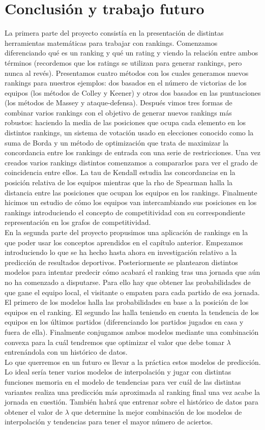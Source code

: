 \chapter{Conclusión y trabajo futuro}
La primera parte del proyecto consistía en la presentación de distintas herramientas matemáticas para trabajar con rankings. Comenzamos diferenciando qué es un ranking y qué un rating y viendo la relación entre ambos términos (recordemos que los ratings se utilizan para generar rankings, pero nunca al revés). Presentamos cuatro métodos con los cuales generamos nuevos rankings para nuestros ejemplos: dos basados en el número de victorias de los equipos (los métodos de Colley y Keener) y otros dos basados en las puntuaciones (los métodos de Massey y ataque-defensa).
Después vimos tres formas de combinar varios rankings con el objetivo de generar nuevos rankings más robustos: haciendo la media de las posiciones que ocupa cada elemento en los distintos rankings, un sistema de votación usado en elecciones conocido como la suma de Borda y un método de optimización que trata de maximizar la concordancia entre los rankings de entrada con una serie de restricciones. 
Una vez creados varios rankings distintos comenzamos a compararlos para ver el grado de coincidencia entre ellos. La tau de Kendall estudia las concordancias en la posición relativa de los equipos mientras que la rho de Spearman halla la distancia entre las posiciones que ocupan los equipos en los rankings. 
Finalmente hicimos un estudio de cómo los equipos van intercambiando sus posiciones en los rankings introduciendo el concepto de competitividad con su correspondiente representación en los grafos de competitividad.\\

En la segunda parte del proyecto propusimos una aplicación de rankings en la que poder usar los conceptos aprendidos en el capítulo anterior. Empezamos introduciendo lo que se ha hecho hasta ahora en investigación relativo a la predicción de resultados deportivos. Posteriormente se plantearon distintos modelos para intentar predecir cómo acabará el ranking tras una jornada que aún no ha comenzado a disputarse. Para ello hay que obtener las probabilidades de que gane el equipo local, el visitante o empaten para cada partido de esa jornada. El primero de los modelos halla las probabilidades en base a la posición de los equipos en el ranking. El segundo las halla teniendo en cuenta la tendencia de los equipos en los últimos partidos (diferenciando los partidos jugados en casa y fuera de ella). Finalmente conjugamos ambos modelos mediante una combinación convexa para la cuál tendremos que optimizar el valor que debe tomar $\lambda$ entrenándola con un histórico de datos.\\

Lo que querremos en un futuro es llevar a la práctica estos modelos de predicción. Lo ideal sería tener varios modelos de interpolación y jugar con distintas funciones memoria en el modelo de tendencias para ver cuál de las distintas variantes realiza una predicción más aproximada al ranking final una vez acabe la jornada en cuestión. También habrá que entrenar sobre el histórico de datos para obtener el valor de $\lambda$ que determine la mejor combinación de los modelos de interpolación y tendencias para tener el mayor número de aciertos.
